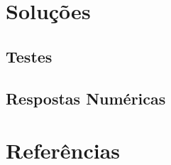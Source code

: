 \documentclass[12pt]{article}
\begin{document}
  \section{\textsf{Soluções}}
    \subsection{Testes}
    \subsection{Respostas Numéricas}

  \clearpage

  \section{\textsf{Referências}}
\end{document}
